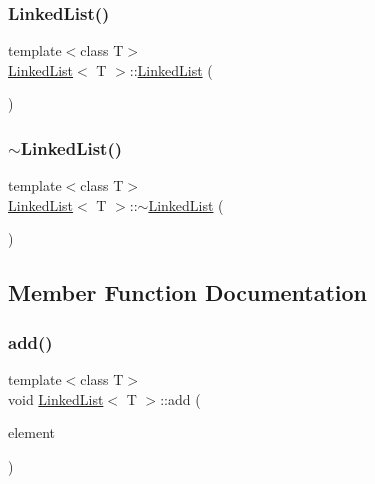 \mbox{\label{classLinkedList_af82224d7ec3e1a5779e9385bf058b6b5}} 
\subsubsection{\texorpdfstring{LinkedList()}{LinkedList()}\hspace{0.1cm}{\footnotesize\ttfamily [4/4]}}
{\footnotesize\ttfamily template$<$class T$>$ \\
\mbox{\hyperlink{classLinkedList}{Linked\+List}}$<$ T $>$\+::\mbox{\hyperlink{classLinkedList}{Linked\+List}} (\begin{DoxyParamCaption}\item[{const \mbox{\hyperlink{classLinkedList}{Linked\+List}}$<$ T $>$ \&}]{ }\end{DoxyParamCaption})}

\mbox{\label{classLinkedList_a7c37609df3b83bc4eb0281b852f93fd7}} 
\subsubsection{\texorpdfstring{$\sim$LinkedList()}{~LinkedList()}\hspace{0.1cm}{\footnotesize\ttfamily [2/2]}}
{\footnotesize\ttfamily template$<$class T$>$ \\
\mbox{\hyperlink{classLinkedList}{Linked\+List}}$<$ T $>$\+::$\sim$\mbox{\hyperlink{classLinkedList}{Linked\+List}} (\begin{DoxyParamCaption}{ }\end{DoxyParamCaption})}



\subsection{Member Function Documentation}
\mbox{\label{classLinkedList_ab7364799e5965dd59d4f5952cb953287}} 
\subsubsection{\texorpdfstring{add()}{add()}\hspace{0.1cm}{\footnotesize\ttfamily [1/2]}}
{\footnotesize\ttfamily template$<$class T$>$ \\
void \mbox{\hyperlink{classLinkedList}{Linked\+List}}$<$ T $>$\+::add (\begin{DoxyParamCaption}\item[{T}]{element }\end{DoxyParamCaption})}

